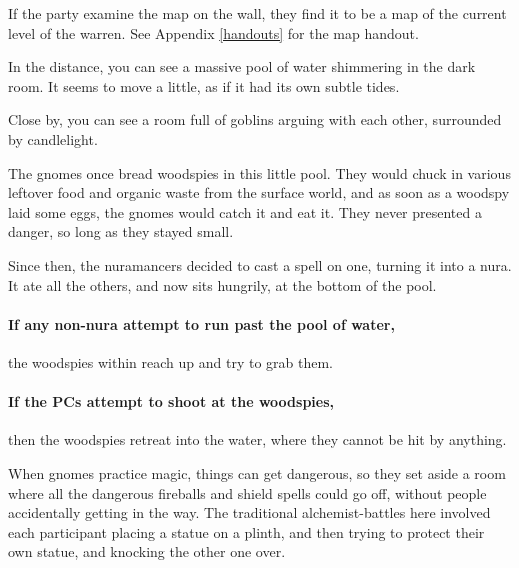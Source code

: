 \begin{multicols}{2}
\begin{itemize}
\end{itemize}

If the party examine the map on the wall, they find it to be a map of the current level of the warren.
See Appendix \ref{handouts} for the map handout.


\begin{boxtext}

	In the distance, you can see a massive pool of water shimmering in the dark room.
	It seems to move a little, as if it had its own subtle tides.

	Close by, you can see a room full of goblins arguing with each other, surrounded by candlelight.

\end{boxtext}

\begin{exampletext}

	The gnomes once bread woodspies in this little pool.
	They would chuck in various leftover food and organic waste from the surface world, and as soon as a woodspy laid some eggs, the gnomes would catch it and eat it.
	They never presented a danger, so long as they stayed small.

	Since then, the nuramancers decided to cast a spell on one, turning it into a nura.
	It ate all the others, and now sits hungrily, at the bottom of the pool.

\end{exampletext}


\paragraph{If any non-nura attempt to run past the pool of water,}
the woodspies within reach up and try to grab them.

\paragraph{If the PCs attempt to shoot at the woodspies,}
then the woodspies retreat into the water, where they cannot be hit by anything.


\begin{exampletext}

	When gnomes practice magic, things can get dangerous, so they set aside a room where all the dangerous fireballs and shield spells could go off, without people accidentally getting in the way.
	The traditional alchemist-battles here involved each participant placing a statue on a plinth, and then trying to protect their own statue, and knocking the other one over.


\end{exampletext}
\end{multicols}
